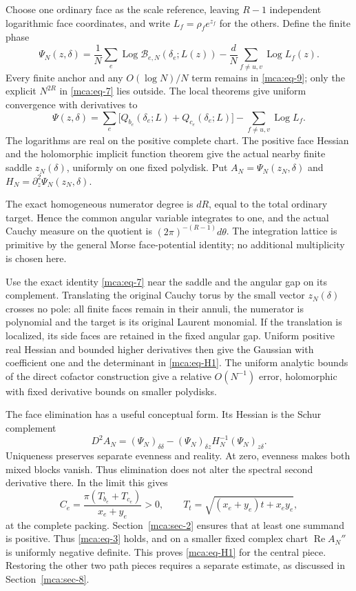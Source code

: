 Choose one ordinary face as the scale reference, leaving $R-1$
independent logarithmic face coordinates, and write
\(L_f=\rho_f e^{z_f}\) for the others. Define the finite phase \begin{equation}\label{mca:eq-9}
\Psi_N(z,\delta)=\frac1N\sum_e\operatorname{Log}
     \mathcal B_{e,N}(\delta_e;L(z))
       -\frac dN\sum_{f\ne u,v}\operatorname{Log}L_f(z).
\end{equation} Every finite anchor and any \(O(\log N)/N\) term remains in
\eqref{mca:eq-9}; only the explicit \(N^{2R}\) in \eqref{mca:eq-7} lies
outside. The local theorems give uniform convergence with derivatives to
\begin{equation}\label{mca:eq-10}
\Psi(z,\delta)=\sum_e
       \bigl[Q_{b_e}(\delta_e;L)+Q_{c_e}(\delta_e;L)\bigr]
                         -\sum_{f\ne u,v}\operatorname{Log}L_f.
\end{equation} The logarithms are real on the positive complete chart. The positive
face Hessian and the holomorphic implicit function theorem give the
actual nearby finite saddle \(z_N(\delta)\), uniformly on one fixed
polydisk. Put \(A_N=\Psi_N(z_N,\delta)\) and
\(H_N=\partial_z^2\Psi_N(z_N,\delta)\).

The exact homogeneous numerator degree is \(dR\), equal to the total
ordinary target. Hence the common angular variable integrates to one,
and the actual Cauchy measure on the quotient is
\((2\pi)^{-(R-1)}d\theta\). The integration lattice is primitive by the
general Morse face-potential identity; no additional multiplicity is
chosen here.

Use the exact identity \eqref{mca:eq-7} near the saddle and the angular gap on
its complement. Translating the original Cauchy torus by the small
vector \(z_N(\delta)\) crosses no pole: all finite faces remain in their
annuli, the numerator is polynomial and the target is its original
Laurent monomial. If the translation is localized, its side faces are
retained in the fixed angular gap. Uniform positive real Hessian and
bounded higher derivatives then give the Gaussian with coefficient one
and the determinant in \eqref{mca:eq-H1}. The uniform analytic bounds of the direct cofactor construction give
a relative \(O(N^{-1})\) error, holomorphic with fixed derivative
bounds on smaller polydisks.

The face elimination has a useful conceptual form. Its Hessian is the
Schur complement
\[
 D^2A_N=(\Psi_N)_{\delta\delta}
       -(\Psi_N)_{\delta z}H_N^{-1}(\Psi_N)_{z\delta}.
\]
Uniqueness preserves separate evenness and reality. At zero, evenness
makes both mixed blocks vanish. Thus elimination does not alter the
spectral second derivative there. In the limit this gives
\begin{equation}\label{mca:eq-11}
C_e=\frac{\pi(T_{b_e}+T_{c_e})}{x_e+y_e}>0,
 \qquad T_t=\sqrt{(x_e+y_e)t+x_ey_e},
\end{equation} at the complete packing.
Section~\ref{mca:sec-2} ensures that at least one
summand is positive. Thus \eqref{mca:eq-3} holds, and on a smaller fixed
complex chart \(\operatorname{Re}A_N''\) is uniformly negative definite.
This proves \eqref{mca:eq-H1} for the central piece. Restoring the other
two path pieces requires a separate estimate, as discussed in
Section~\ref{mca:sec-8}.

